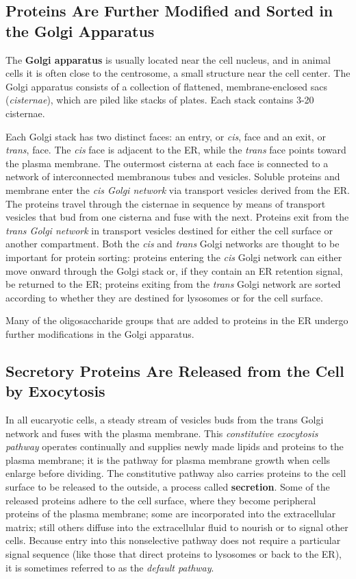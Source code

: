 \subsection{Proteins Are Further Modified and Sorted in the Golgi Apparatus}

The \textbf{Golgi apparatus} is usually located near the cell nucleus, and in
animal cells it is often close to the centrosome, a small structure near
the cell center. The Golgi apparatus consists of a collection of flattened,
membrane-enclosed sacs (\textit{cisternae}), which are piled like stacks of plates.
Each stack contains 3-20 cisternae.

Each Golgi stack has two distinct faces: an entry, or \textit{cis}, face and an exit,
or \textit{trans}, face. The \textit{cis} face is adjacent to the ER, while the \textit{trans} face
points toward the plasma membrane. The outermost cisterna at each
face is connected to a network of interconnected membranous tubes and
vesicles. Soluble proteins and membrane enter the
\textit{cis Golgi network} via transport vesicles derived from the ER. The proteins
travel through the cisternae in sequence by means of transport vesicles
that bud from one cisterna and fuse with the next. Proteins exit from the
\textit{trans Golgi network} in transport vesicles destined for either the cell surface 
or another compartment. Both the \textit{cis} and \textit{trans}
Golgi networks are thought to be important for protein sorting: proteins
entering the \textit{cis} Golgi network can either move onward through the Golgi
stack or, if they contain an ER retention signal, be returned to the ER;
proteins exiting from the \textit{trans} Golgi network are sorted according to
whether they are destined for lysosomes or for the cell surface.

Many of the oligosaccharide groups that are added to proteins in the ER
undergo further modifications in the Golgi apparatus.

\subsection{Secretory Proteins Are Released from the Cell by Exocytosis}

In all eucaryotic cells, a steady stream of vesicles buds from the trans
Golgi network and fuses with the plasma membrane. This \textit{constitutive
exocytosis pathway} operates continually and supplies newly made lipids
and proteins to the plasma membrane; it is the pathway for
plasma membrane growth when cells enlarge before dividing. The constitutive 
pathway also carries proteins to the cell surface to be released
to the outside, a process called \textbf{secretion}. Some of the released proteins
adhere to the cell surface, where they become peripheral proteins of the
plasma membrane; some are incorporated into the extracellular matrix;
still others diffuse into the extracellular fluid to nourish or to signal other
cells. Because entry into this nonselective pathway does not require a
particular signal sequence (like those that direct proteins to lysosomes or
back to the ER), it is sometimes referred to as the \textit{default pathway}.

